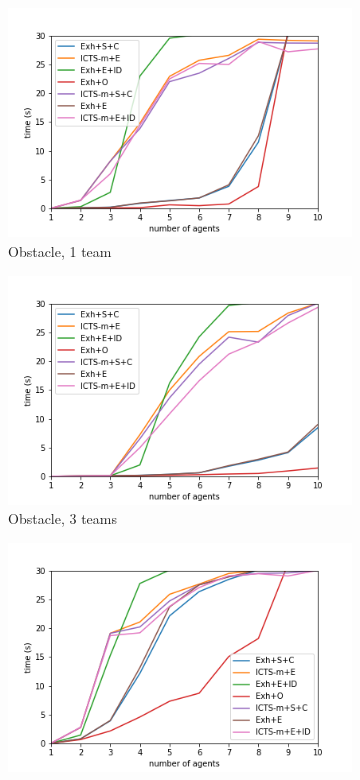 \documentclass[english]{article}
\begin{document}
\begin{figure}
\begin{subfigure}{0.49\textwidth}
		\includegraphics[width=\linewidth]{img/results/obstacle-1}
		\caption{Obstacle, 1 team}
		\label{fig:obstacle1}
	\end{subfigure}
	\begin{subfigure}{0.49\textwidth}
		\centering
		\includegraphics[width=\linewidth]{img/results/obstacle-3}
		\caption{Obstacle, 3 teams}
		\label{fig:obstacle3}
	\end{subfigure}
	\begin{subfigure}{0.49\textwidth}
		\centering
		\includegraphics[width=\linewidth]{img/results/maze-1}

\end{subfigure}
\end{figure}
\end{document}
